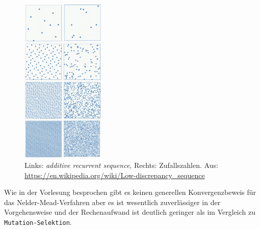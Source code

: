 \documentclass[a4paper, 12pt]{report}
\begin{document}
\begin{figure}[H]
  \centering
  \includegraphics[height=8cm]{Subrandom_2D.png}
  \caption{Links: \textit{additive recurrent sequence}, Rechts: Zufallszahlen. Aus: \protect\url{https://en.wikipedia.org/wiki/Low-discrepancy_sequence}}
\end{figure}
Wie in der Vorlesung besprochen gibt es keinen generellen Konvergenzbeweis für das Nelder-Mead-Verfahren aber es ist wesentlich zuverlässiger
in der Vorgehensweise und der Rechenaufwand ist deutlich geringer als im Vergleich zu \lstinline[basicstyle=\ttfamily\color{black}]|Mutation-Selektion|.
\end{document}
